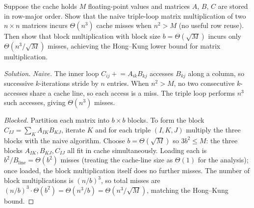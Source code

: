 \begin{problem}
\label{prob:cache-blocking}
Suppose the cache holds $M$ floating-point values and matrices $A$, $B$,
$C$ are stored in row-major order. Show that the naive triple-loop
matrix multiplication of two $n \times n$ matrices incurs
$\Theta(n^3)$ cache misses when $n^2 > M$ (no useful row reuse). Then
show that block multiplication with block size $b = \Theta(\sqrt{M})$
incurs only $\Theta(n^3 / \sqrt{M})$ misses, achieving the
Hong--Kung lower bound for matrix multiplication.
\end{problem}

\begin{proof}[Solution]
\emph{Naive.} The inner loop $C_{ij} \mathrel{+}= A_{ik} B_{kj}$
accesses $B_{kj}$ along a column, so successive $k$-iterations stride
by $n$ entries. When $n^2 > M$, no two consecutive $k$-accesses share
a cache line, so each access is a miss. The triple loop performs
$n^3$ such accesses, giving $\Theta(n^3)$ misses.

\emph{Blocked.} Partition each matrix into $b \times b$ blocks. To
form the block $C_{IJ} = \sum_K A_{IK} B_{KJ}$, iterate $K$ and for
each triple $(I, K, J)$ multiply the three blocks with the naive
algorithm. Choose $b = \Theta(\sqrt{M})$ so $3 b^2 \le M$: the three
blocks $A_{IK}, B_{KJ}, C_{IJ}$ all fit in cache simultaneously.
Loading each is $b^2 / B_{\text{line}} = \Theta(b^2)$ misses (treating
the cache-line size as $\Theta(1)$ for the analysis); once loaded,
the block multiplication itself does no further misses. The number of
block multiplications is $(n / b)^3$, so total misses are
$(n / b)^3 \cdot \Theta(b^2) = \Theta(n^3 / b) = \Theta(n^3 / \sqrt{M})$,
matching the Hong--Kung bound.
\end{proof}
